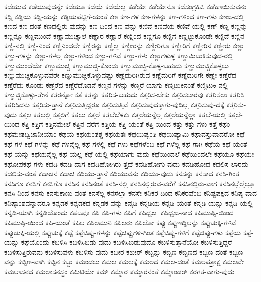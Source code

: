 {ಕಡೆಯುವ
ಕಡೆಯುವುದನ್ನೇ
ಕಡೆಯೂ
ಕಡೆಯೆ
ಕಡೆಯೆಲ್ಲ
ಕಡೆಯೇ
ಕಡೆಯೇನೂ
ಕಡೆಸಂಗ್ರಹಿಸಿ
ಕಡೆಹಾಯಿಸುವನು
ಕಡ್ಡಿ
ಕಡ್ಡಿಯ
ಕಡ್ಡಿ-ಯನ್ನು
ಕಡ್ಡಿಯಪೆಟ್ಟಿಗೆ-ಯಂತೆ
ಕಣ
ಕಣ-ಗಳ
ಕಣ-ಗಳನ್ನು
ಕಣ-ಗಳಿಂದ
ಕಣ-ಗಳು
ಕಣಜ-ದಲ್ಲಿ
ಕಣದ
ಕಣ-ದಂತೆ
ಕಣದಲ್ಲಿರು-ವುದನ್ನು
ಕಣ-ದಿಂದ
ಕಣ-ವನ್ನು
ಕಣಿವೆ
ಕಣಿವೆಯ
ಕಣಿವೆ-ಯಲ್ಲಿ
ಕಣ್
ಕಣ್ಣ
ಕಣ್ಣನ್ನು
ಕಣ್ಣನ್ನೂ
ಕಣ್ಣಮುಂದೆ
ಕಣ್ಣಾಮುಚ್ಚಾಲೆ
ಕಣ್ಣಾರ
ಕಣ್ಣಾರೆ
ಕಣ್ಣಿಂದ
ಕಣ್ಣಿಗೂ
ಕಣ್ಣಿಗೆ
ಕಣ್ಣಿಟ್ಟುಕೊಂಡೇ
ಕಣ್ಣಿದೆ
ಕಣ್ಣಿನ
ಕಣ್ಣಿ-ನಲ್ಲಿ
ಕಣ್ಣಿ-ನಿಂದ
ಕಣ್ಣಿನಿಂದಲೇ
ಕಣ್ಣಿರನ್ನು
ಕಣ್ಣಿಲ್ಲ
ಕಣ್ಣೀರನ್ನು
ಕಣ್ಣೀರಿಗೂ
ಕಣ್ಣೀರಿಗೆ
ಕಣ್ಣೀರಿನ
ಕಣ್ಣೀರು
ಕಣ್ಣು
ಕಣ್ಣು-ಗಳನ್ನು
ಕಣ್ಣು-ಗಳಲ್ಲ
ಕಣ್ಣು-ಗಳಿಂದ
ಕಣ್ಣು-ಗಳಿವೆ
ಕಣ್ಣು-ಗಳು
ಕಣ್ಣುಗಳುಳ್ಳ
ಕಣ್ಣುಮಿಟುಕಿಸುವುದ-ರಲ್ಲಿ
ಕಣ್ಣುಮುಂದೆಯೇ
ಕಣ್ಣುಮುಚ್ಚಿ
ಕಣ್ಣುಮುಚ್ಚಿ-ಕೊಂಡು
ಕಣ್ಣುಮುಚ್ಚಿ-ಕೊಳ್ಳ-ಬಹುದು
ಕಣ್ಣುಮುಚ್ಚಿಕೊಳ್ಳಲು
ಕಣ್ಣುಮುಚ್ಚಿಕೊಳ್ಳುವವರೇ
ಕಣ್ಣುಮುಚ್ಚಿಕೊಳ್ಳುವಷ್ಟು
ಕಣ್ಣೆದುರಿಗಿರುವ
ಕಣ್ಣೆದುರಿಗೆ
ಕಣ್ಣೆದುರಿಗೇ
ಕಣ್ಣೇ
ಕಣ್ತೆರೆದ
ಕಣ್ತೆರೆದು-ಕೊಂಡು
ಕಣ್ದೆರೆದ
ಕಣ್ದೆರೆದೊಡನೆ
ಕಣ್ಮನ-ಗಳನ್ನು
ಕಣ್ಮರೆ-ಯಾಗು
ಕಣ್ಮಿಟುಕಿನಂತೆ
ಕಣ್ಮಿಟುಕಿ-ನಲ್ಲಿ
ಕಣ್ಮುಚ್ಚಿಕೊಳ್ಳು-ತ್ತೇನೆ
ಕತರನ್ನೋ
ಕತೆ
ಕತ್ತನ್ನು
ಕತ್ತರಿಸ-ಬಹುದು
ಕತ್ತರಿಸ-ಬೇಕು
ಕತ್ತರಿಸಲಾರವು
ಕತ್ತರಿಸಲು
ಕತ್ತರಿಸಿ
ಕತ್ತರಿಸಿದನು
ಕತ್ತರಿಸು-ತ್ತಾನೆ
ಕತ್ತರಿಸುತ್ತಿದ್ದರೂ
ಕತ್ತರಿಸುತ್ತಿವೆ
ಕತ್ತರಿಸುವುದಕ್ಕಾಗು-ವುದಿಲ್ಲ
ಕತ್ತರಿಸುವು-ದಕ್ಕೆ
ಕತ್ತರಿಸು-ವುದು
ಕತ್ತಲ
ಕತ್ತಲಲ್ಲಿ
ಕತ್ತಲಿಗೆ
ಕತ್ತಲು
ಕತ್ತಲೆ
ಕತ್ತಲೆಬೆಳಕು
ಕತ್ತಲೆಯನ್ನೆಲ್ಲ
ಕತ್ತಲೆಯನ್ನೆಲ್ಲಾ
ಕತ್ತಲೆ-ಯಲ್ಲಿ
ಕತ್ತಲೆ-ಯಿಂದ
ಕತ್ತಿ
ಕತ್ತಿಗೆ
ಕತ್ತಿನಮೇಲೆ
ಕತ್ತಿನ-ವರೆಗೆ
ಕತ್ತಿಯ
ಕತ್ತಿ-ಯಂತೆ
ಕತ್ತಿ-ಯಿಂದ
ಕತ್ತು
ಕತ್ತು-ಗಳು
ಕತ್ತೆ
ಕಥಂ
ಕಥಮೇತದ್ವಿಜಾನೀಯಾಂ
ಕಥಯ
ಕಥಯಂತಶ್ಚ
ಕಥಯತಃ
ಕಥಯಿಷ್ಯಂತಿ
ಕಥಯಿಷ್ಯಾಮಿ
ಕಥಾವಸ್ತುವಾದರೋ
ಕಥೆ
ಕಥೆ-ಗಳ
ಕಥೆ-ಗಳನ್ನು
ಕಥೆ-ಗಳನ್ನೆಲ್ಲ
ಕಥೆ-ಗಳಲ್ಲಿ
ಕಥೆ-ಗಳು
ಕಥೆಗಳೆಂಬ
ಕಥೆ-ಗಳೆಲ್ಲ
ಕಥೆ-ಗಾಗಿ
ಕಥೆಯ
ಕಥೆ-ಯಂತೆ
ಕಥೆ-ಯನ್ನು
ಕಥೆಯನ್ನೆಲ್ಲ
ಕಥೆ-ಯಲ್ಲ
ಕಥೆ-ಯಲ್ಲಿ
ಕಥೆಯಾಗು-ವುದು
ಕಥೆಯಿಂದಲೆ
ಕಥೆಯಿಂದಲೇ
ಕಥೆಯೂ
ಕಥೆಯೇ
ಕಥೋಪಕಥೆ-ಗಳು
ಕದಡಿ
ಕದಡಿ-ದಾಗ
ಕದಡಿಹೋಗಿರು-ತ್ತದೆ
ಕದಡಿಹೋಗು-ವುದು
ಕದಡಿಹೋದ
ಕದಲಿಸ-ಲಾರದು
ಕದಲಿಸು-ವಂತೆ
ಕದಾಚನ
ಕದಾಚಿ
ಕದಿಯು-ತ್ತಾನೆ
ಕದಿಯುವನು
ಕದಿಯು-ವುದು
ಕನಸನ್ನು
ಕನಸಾದ
ಕನಸಿ-ಗಿಂತ
ಕನಸಿಗೂ
ಕನಸಿಗೆ
ಕನಸಿಗೊ
ಕನಸಿನ
ಕನಸಿನಂತೆ
ಕನಸಿ-ನಲ್ಲಿ
ಕನಸಿನಲ್ಲಿರುವ-ವರೆಗೆ
ಕನಸಿನಲ್ಲಿರು-ವಾಗ
ಕನಸಿನಲ್ಲೆಲ್ಲೆಲ್ಲೂ
ಕನಸಿ-ನಿಂದ
ಕನಸು
ಕನಸುಕಾಣು-ವಂತೆ
ಕನಸೆಲ್ಲ
ಕನಸೆಲ್ಲಾ
ಕನಸೇ
ಕನಿಕರ-ದಿಂದ
ಕನಿಕರವೆಂಬ
ಕನಿಷ್ಟಪಕ್ಷದ
ಕನಿಷ್ಠ-ವಾದ
ಕನಿಷ್ಠಾಂಶವನ್ನಾದರೂ
ಕನ್ನಡಕ
ಕನ್ನಡಕದ
ಕನ್ನಡಕ-ವನ್ನು
ಕನ್ನಡಿ
ಕನ್ನಡಿಯ
ಕನ್ನಡಿ-ಯಂತೆ
ಕನ್ನಡಿ-ಯನ್ನು
ಕನ್ನಡಿ-ಯಲ್ಲಿ
ಕನ್ನಡಿ-ಯಾಗಿ
ಕನ್ನಡಿಯೊಂದು
ಕಪಟವೂ
ಕಪಿ
ಕಪಿ-ಗಳು
ಕಪಿಗೆ
ಕಪಿಧ್ವಜಃ
ಕಪಿಧ್ವಜ-ನಾದ
ಕಪಿಮುಷ್ಟಿ-ಯಿಂದ
ಕಪಿಮುಷ್ಠಿ-ಯಿಂದ
ಕಪಿ-ಯಂತೆ
ಕಪಿಲ
ಕಪಿಲಮುನಿ
ಕಪಿಲರು
ಕಪಿಲೋ
ಕಪ್ಪು
ಕಪ್ಪುಇದ್ದಿಲನ್ನು
ಕಪ್ಪುಚುಕ್ಕಿ-ಗಳಿವೆ
ಕಪ್ಪುಚುಕ್ಕಿ-ಯಲ್ಲಿ
ಕಪ್ಪುಚುಕ್ಕೆ
ಕಪ್ಪೆ
ಕಪ್ಪೆಚಿಪ್ಪು-ಗಳನ್ನು
ಕಪ್ಪೆಚಿಪ್ಪುಗಳಿ-ಗಿಂತ
ಕಪ್ಪೆಚಿಪ್ಪು-ಗಳಿಗೆ
ಕಪ್ಪೆಚಿಪ್ಪು-ಗಳು
ಕಪ್ಪೆಯ
ಕಪ್ಪೆ-ಯನ್ನು
ಕಪ್ಪೆಯೊಂದು
ಕಬಳಿಸಿ
ಕಬಳಿಸಿಬಿಡು-ವುದು
ಕಬಳಿಸಿಬಿಡುವುದೊ
ಕಬಳಿಸುತ್ತಾನೆಯೋ
ಕಬಳಿಸುತ್ತಿದ್ದರೆ
ಕಬಳಿಸುತ್ತಿರುವನು
ಕಬಳಿಸುವಳು
ಕಬಳಿಸು-ವುದು
ಕಬೀರ
ಕಬೀರ್
ಕಬ್ಬನ್ನು
ಕಬ್ಬಿಣ
ಕಬ್ಬಿಣದ
ಕಬ್ಬಿಣ-ದಂತೆ
ಕಬ್ಬಿಣ-ವನ್ನು
ಕಬ್ಬಿಣ-ವಾಗಿ
ಕಬ್ಬಿನ
ಕಬ್ಬು
ಕಮಂಡಲು
ಕಮಲ
ಕಮಲಕ್ಕೆ
ಕಮಲದ
ಕಮಲ-ದಂತೆ
ಕಮಲಪತ್ರಾಕ್ಷ
ಕಮಲವೇ
ಕಮಲಾಸನದ
ಕಮಲಾಸನಸ್ಥಂ
ಕಮಿಟಿಯೇ
ಕಮ್
ಕಮ್ಮಾರ
ಕಮ್ಮಾರನಂತೆ
ಕಮ್ಯಾಂಡರ್
ಕರಗತ-ವಾಗು-ವುದು
}
